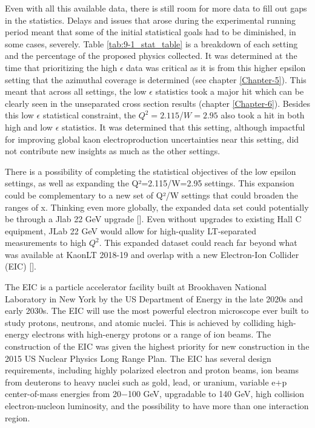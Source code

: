 \documentclass[
]{report}
\begin{document}
Even with all this available data, there is still room for more data to
fill out gaps in the statistics. Delays and issues that arose during the
experimental running period meant that some of the initial statistical
goals had to be diminished, in some cases, severely. Table
\ref{tab:9-1_stat_table} is a breakdown of each setting and the
percentage of the proposed physics collected. It was determined at the
time that prioritizing the high \(\epsilon\) data was critical as it is
from this higher epsilon setting that the azimuthal coverage is
determined (see chapter \ref{Chapter-5}). This meant that across all
settings, the low \(\epsilon\) statistics took a major hit which can be
clearly seen in the unseparated cross section results (chapter
\ref{Chapter-6}). Besides this low \(\epsilon\) statistical constraint,
the \(Q^2=2.115\)/\(W=2.95\) also took a hit in both high and low
\(\epsilon\) statistics. It was determined that this setting, although
impactful for improving global kaon electroproduction uncertainties near
this setting, did not contribute new insights as much as the other
settings.



There is a possibility of completing the statistical objectives of the
low epsilon settings, as well as expanding the Q²=2.115/W=2.95 settings.
This expansion could be complementary to a new set of Q²/W settings that
could broaden the ranges of x. Thinking even more globally, the expanded
data set could potentially be through a Jlab 22 GeV upgrade
{[}\cite{accardi_strong_2023}{]}. Even without upgrades to existing Hall
C equipment, JLab 22 GeV would allow for high-quality LT-separated
measurements to high \(Q^2\). This expanded dataset could reach far
beyond what was available at KaonLT 2018-19 and overlap with a new
Electron-Ion Collider (EIC) {[}\cite{kay_future_2023}{]}.

\label{Chapter-7-2}



The EIC is a particle accelerator facility built at Brookhaven National
Laboratory in New York by the US Department of Energy in the late 2020s
and early 2030s. The EIC will use the most powerful electron microscope
ever built to study protons, neutrons, and atomic nuclei. This is
achieved by colliding high-energy electrons with high-energy protons or
a range of ion beams. The construction of the EIC was given the highest
priority for new construction in the 2015 US Nuclear Physics Long Range
Plan. The EIC has several design requirements, including highly
polarized electron and proton beams, ion beams from deuterons to heavy
nuclei such as gold, lead, or uranium, variable e+p center-of-mass
energies from 20−100 GeV, upgradable to 140 GeV, high collision
electron-nucleon luminosity, and the possibility to have more than one
interaction region.
\end{document}
